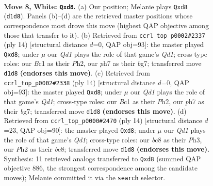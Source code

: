 \documentclass[11pt]{article}
\begin{document}
\begin{figure}[p]\centering
\begin{subfigure}{0.46\textwidth}\centering
\resizebox{\linewidth}{!}{%
\newchessgame
\chessboard[
  setfen={rnbq1rk1/ppp2pbp/5np1/4p3/2P1P3/2N2N2/PP2BPPP/R1BQK2R w KQ - 0 8},
  showmover=false,
  pgfstyle=straightmove, color=movearrow, markmove={d1-d8}
]}
\caption{}
\end{subfigure}\hfill
\begin{subfigure}{0.46\textwidth}\centering
\resizebox{\linewidth}{!}{%
\newchessgame
\chessboard[
  setfen={rnbq1rk1/ppp2pbp/5np1/4p3/2P1P3/2N2N2/PP2BPPP/R1BQK2R w KQ - 0 8},
  showmover=false,
  pgfstyle=straightmove, color=movearrow, markmove={d1-d8}
]}
\caption{}
\end{subfigure}
\\[4pt]
\begin{subfigure}{0.46\textwidth}\centering
\resizebox{\linewidth}{!}{%
\newchessgame
\chessboard[
  setfen={rnbq1rk1/ppp2pbp/5np1/4p3/2P1P3/2N2N2/PP2BPPP/R1BQK2R w KQ - 0 8},
  showmover=false,
  pgfstyle=straightmove, color=movearrow, markmove={d1-d8}
]}
\caption{}
\end{subfigure}\hfill
\begin{subfigure}{0.46\textwidth}\centering
\resizebox{\linewidth}{!}{%
\newchessgame
\chessboard[
  setfen={rnbq1rk1/ppp2pbp/5np1/4p3/2P1P3/2N2N1P/PP3PP1/R1BQKB1R w KQ - 0 8},
  showmover=false,
  pgfstyle=straightmove, color=movearrow, markmove={d1-d8}
]}
\caption{}
\end{subfigure}
\caption{\textbf{Move 8, White: \texttt{Qxd8}.} (a) Our position; Melanie plays \texttt{Qxd8} (\texttt{d1d8}). Panels (b)--(d) are the retrieved master positions whose correspondence most drove this move (highest QAP objective among those that transfer to it). (b) Retrieved from \texttt{ccrl\_top\_p0002\#2337} (ply 14) [structural distance $d$=0, QAP obj=93]: the master played \texttt{Qxd8}; under $\mu$ our \emph{Qd1} plays the role of that game's \emph{Qd1}; cross-type roles: our \emph{B}c1 as their \emph{P}h2, our \emph{p}h7 as their \emph{b}g7; transferred move \texttt{d1d8} \textbf{(endorses this move)}. (c) Retrieved from \texttt{ccrl\_top\_p0002\#2338} (ply 14) [structural distance $d$=0, QAP obj=93]: the master played \texttt{Qxd8}; under $\mu$ our \emph{Qd1} plays the role of that game's \emph{Qd1}; cross-type roles: our \emph{B}c1 as their \emph{P}h2, our \emph{p}h7 as their \emph{b}g7; transferred move \texttt{d1d8} \textbf{(endorses this move)}. (d) Retrieved from \texttt{ccrl\_top\_p0000\#2470} (ply 14) [structural distance $d$=23, QAP obj=90]: the master played \texttt{Qxd8}; under $\mu$ our \emph{Qd1} plays the role of that game's \emph{Qd1}; cross-type roles: our \emph{b}c8 as their \emph{P}h3, our \emph{P}h2 as their \emph{b}c8; transferred move \texttt{d1d8} \textbf{(endorses this move)}. Synthesis: 11 retrieved analogs transferred to \texttt{Qxd8} (summed QAP objective 886, the strongest correspondence among the candidate moves); Melanie committed it via the \texttt{search} selector.}
\label{fig:thought-m14}
\end{figure}
\end{document}
